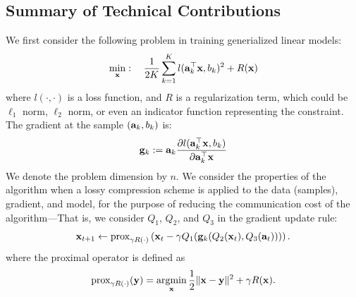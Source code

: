\documentclass{article}
\renewcommand{\vec}[1]{\mathbf{#1}}
\def\a{{\bf a}}
\def\g{{\bf g}}
\def\x{{\bf x}}
\def\y{{\bf y}}
\DeclareMathOperator*{\argmin}{argmin}
\begin{document}

\vspace{-1em}
\subsection*{Summary of Technical Contributions}

We first consider the following problem in training generialized linear models: 
\begin{align}
\min_{\x}:\quad {1\over 2K}\sum_{k=1}^K l(\a_k^\top \x, b_k)^2 + R(\x)
\label{eqn:leastsquares}
\end{align}
where $l(\cdot,\cdot)$ is a loss function, and $R$ is a regularization term, which could be $\ell_1$ norm, $\ell_2$ norm, or even an indicator function representing the constraint. 
The gradient at the sample $(\a_k, b_k)$ is: 
\[
\g_k := \a_k \frac{\partial l(\a_k^\top \x, b_k)}{\partial \a_k^\top \x} 
\]
We denote the problem dimension by $n$. 
We consider the properties of the algorithm when a lossy compression scheme is applied to the data (samples), 
gradient, and model, for the purpose of reducing the communication cost of the algorithm---That is, 
we consider $Q_1$, $Q_2$, and $Q_3$ in the gradient update rule:
\begin{align}
\x_{t + 1} \leftarrow \text{prox}_{\gamma R(\cdot)}\left(\x_t - \gamma Q_1(\g_k (Q_2(\x_t), Q_3(\vec{a}_t)))\right).
\label{eq:proxupdate}
\end{align}
where the proximal operator is defined as
\[
\text{prox}_{\gamma R(\cdot)}(\y) =\argmin_{\x} {1\over 2}\|\x-\y\|^2 + \gamma R(\x).
\]
\end{document}
